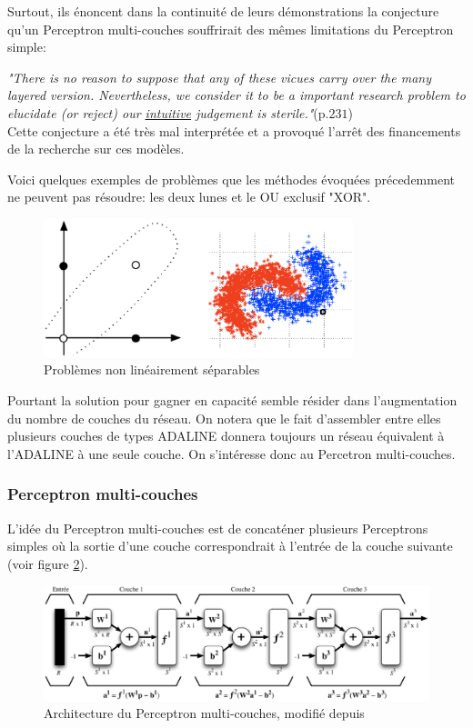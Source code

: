 Surtout, ils énoncent dans la continuité de leurs démonstrations la conjecture qu'un Perceptron multi-couches souffrirait des mêmes limitations du Perceptron simple:

\textit{"There is no reason to suppose that any of these vicues carry over the
many layered version. Nevertheless, we consider it to be a important research
problem to elucidate (or reject) our \underline{intuitive} judgement is
sterile."}(p.$231$)\cite{minsky} \\

Cette conjecture a été très mal interprétée et a provoqué l'arrêt des financements de la recherche sur ces modèles.

Voici quelques exemples de problèmes que les méthodes évoquées précedemment ne peuvent pas résoudre: les deux lunes et le OU exclusif "XOR".

\begin{figure}
\begin{center}
\includegraphics[width=9cm]{predoc/images/xor2moons.eps}
\end{center}
\caption{\label{fig:robustpercep} Problèmes non linéairement séparables}
\end{figure}


Pourtant la solution pour gagner en capacité semble résider dans l'augmentation
du nombre de couches du réseau. On notera que le fait d'assembler entre elles
plusieurs couches de types ADALINE donnera toujours un réseau équivalent à
l'ADALINE à une seule couche. On s'intéresse donc au Percetron multi-couches.

\subsubsection{Perceptron multi-couches}

L'idée du Perceptron multi-couches est de concaténer plusieurs Perceptrons
simples où la sortie d'une couche correspondrait à l'entrée de la couche
suivante (voir figure \ref{fig:percep_multicouche}).

\begin{figure}[!h]
\begin{center}
\includegraphics[width=12cm]{predoc/images/percep_multi.eps}
\end{center}
\caption{\label{fig:percep_multicouche} Architecture du Perceptron multi-couches, modifié depuis \cite{parizeau}}
\end{figure}

